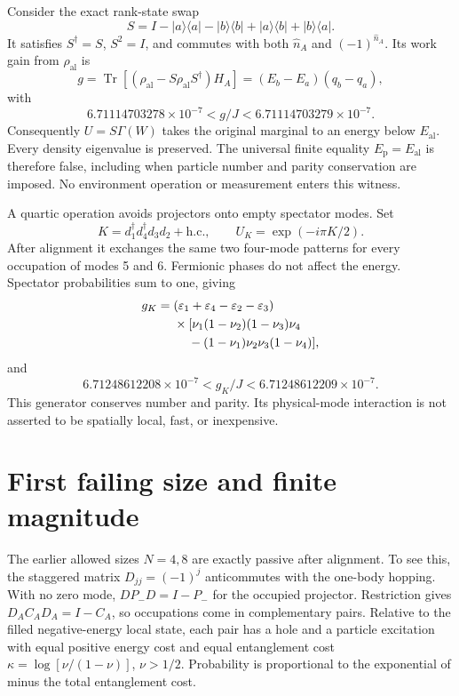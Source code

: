 \documentclass[aps,prb,reprint,amsmath,amssymb,longbibliography,floatfix]{revtex4-2}
\newcommand{\Tr}{\operatorname{Tr}}
\newcommand{\ket}[1]{\lvert #1\rangle}
\newcommand{\bra}[1]{\langle #1\rvert}
\newcommand{\al}{\mathrm{al}}
\newcommand{\pa}{\mathrm{p}}
\begin{document}
Consider the exact rank-state swap
\begin{equation}
 S=I-\ket a\bra a-\ket b\bra b+\ket a\bra b+\ket b\bra a.
 \label{eq:S}
\end{equation}
It satisfies $S^\dagger=S$, $S^2=I$, and commutes with both $\widehat n_A$
and $(-1)^{\widehat n_A}$. Its work gain from $\rho_{\al}$ is
\begin{equation}
 g=\Tr[(\rho_{\al}-S\rho_{\al}S^\dagger)H_A]
   =(E_b-E_a)(q_b-q_a),
\end{equation}
with
\begin{equation}
 6.71114703278\times10^{-7}<g/J<6.71114703279\times10^{-7}.
 \label{eq:gain}
\end{equation}
Consequently $U=S\Gamma(W)$ takes the original marginal to an energy below
$E_{\al}$. Every density eigenvalue is preserved. The universal finite
equality $E_{\pa}=E_{\al}$ is therefore false, including when particle
number and parity conservation are imposed. No environment operation or
measurement enters this witness.

A quartic operation avoids projectors onto empty spectator modes. Set
\begin{equation}
 K=d_1^\dagger d_4^\dagger d_3d_2+\mathrm{h.c.},\qquad
 U_K=\exp(-i\pi K/2).
\end{equation}
After alignment it exchanges the same two four-mode patterns for every
occupation of modes 5 and 6. Fermionic phases do not affect the energy.
Spectator probabilities sum to one, giving
\begin{equation}
 \begin{split}
 g_K={}&(\varepsilon_1+\varepsilon_4-\varepsilon_2-\varepsilon_3)\\
 &\times[\nu_1(1-\nu_2)(1-\nu_3)\nu_4\\
 &\hspace{1.2em}-(1-\nu_1)\nu_2\nu_3(1-\nu_4)],
 \end{split}
\end{equation}
and
\begin{equation}
 6.71248612208\times10^{-7}<g_K/J<6.71248612209\times10^{-7}.
\end{equation}
This generator conserves number and parity. Its physical-mode interaction
is not asserted to be spatially local, fast, or inexpensive.

\section{First failing size and finite magnitude}
The earlier allowed sizes $N=4,8$ are exactly passive after alignment.
To see this, the staggered matrix $D_{jj}=(-1)^j$ anticommutes with the
one-body hopping. With no zero mode, $DP_-D=I-P_-$ for the occupied
projector. Restriction gives $D_AC_AD_A=I-C_A$, so occupations come in
complementary pairs. Relative to the filled negative-energy local state,
each pair has a hole and a particle excitation with equal positive energy
cost and equal entanglement cost $\kappa=\log[\nu/(1-\nu)]$, $\nu>1/2$.
Probability is proportional to the exponential of minus the total
entanglement cost.
\end{document}
